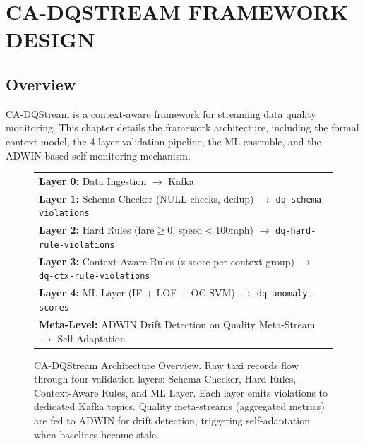 \newpage
\chapter{CA-DQSTREAM FRAMEWORK DESIGN}
\pagestyle{fancy}

\section{Overview}

CA-DQStream is a context-aware framework for streaming data quality monitoring. This chapter details the framework architecture, including the formal context model, the 4-layer validation pipeline, the ML ensemble, and the ADWIN-based self-monitoring mechanism.

\begin{figure}[H]
\centering
\begin{small}
\begin{tabular}{l}
\textbf{Layer 0:} Data Ingestion $\rightarrow$ Kafka \\
\textbf{Layer 1:} Schema Checker (NULL checks, dedup) $\rightarrow$ \texttt{dq-schema-violations} \\
\textbf{Layer 2:} Hard Rules (fare$\geq$0, speed$<$100mph) $\rightarrow$ \texttt{dq-hard-rule-violations} \\
\textbf{Layer 3:} Context-Aware Rules (z-score per context group) $\rightarrow$ \texttt{dq-ctx-rule-violations} \\
\textbf{Layer 4:} ML Layer (IF + LOF + OC-SVM) $\rightarrow$ \texttt{dq-anomaly-scores} \\
\textbf{Meta-Level:} ADWIN Drift Detection on Quality Meta-Stream $\rightarrow$ Self-Adaptation \\
\end{tabular}
\end{small}
\caption{CA-DQStream Architecture Overview. Raw taxi records flow through four validation layers: Schema Checker, Hard Rules, Context-Aware Rules, and ML Layer. Each layer emits violations to dedicated Kafka topics. Quality meta-streams (aggregated metrics) are fed to ADWIN for drift detection, triggering self-adaptation when baselines become stale.}
\label{fig:architecture_overview}
\end{figure}

